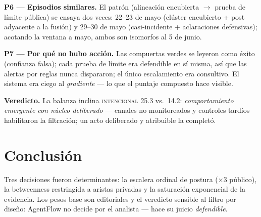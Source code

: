 \documentclass{vgtc}                %
\begin{document}
\textbf{P6 --- Episodios similares.} El patr\'on (alineaci\'on
encubierta $\to$ prueba de l\'imite p\'ublica) se ensaya dos veces:
22--23 de mayo (cl\'uster encubierto + post adyacente a la fusi\'on) y
29--30 de mayo (casi-incidente + aclaraciones defensivas); acotando
la ventana a mayo, ambos son isomorfos al 5 de junio.

\textbf{P7 --- Por qu\'e no hubo acci\'on.} Las compuertas verdes se
leyeron como \'exito (confianza falsa); cada prueba de l\'imite era
defendible en s\'i misma, as\'i que las alertas por reglas nunca
dispararon; el \'unico escalamiento era consultivo. El sistema era
ciego al \emph{gradiente} --- lo que el puntaje compuesto hace
visible.

\textbf{Veredicto.} La balanza inclina \textsc{intencional} 25.3 vs.\
14.2: \emph{comportamiento emergente con n\'ucleo deliberado} ---
canales no monitoreados y controles tard\'ios habilitaron la
filtraci\'on; un acto deliberado y atribuible la complet\'o.

\section{Conclusi\'on}

Tres decisiones fueron determinantes: la escalera ordinal de postura
($\times 3$ p\'ublico), la betweenness restringida a aristas privadas
y la saturaci\'on exponencial de la evidencia. Los pesos base son
editoriales y el veredicto sensible al filtro por dise\~no: AgentFlow
no decide por el analista --- hace su juicio \emph{defendible}.
\end{document}
